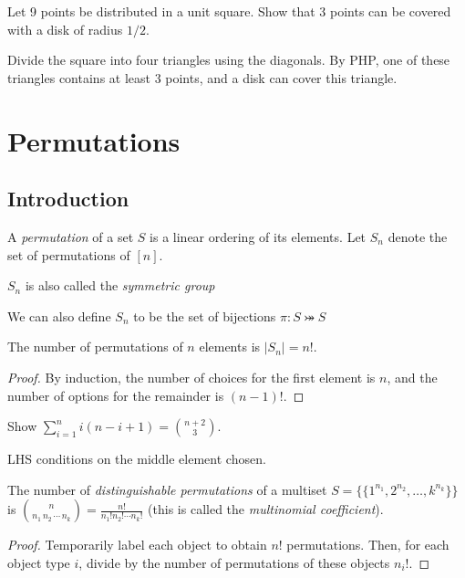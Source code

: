 \documentclass[a4paper]{article}
\begin{document}
\begin{example}
Let 9 points be distributed in a unit square. Show that 3 points can be covered with a disk of radius $1/2$.

\begin{hl}
Divide the square into four triangles using the diagonals. By PHP, one of these triangles contains at least 3 points, and a disk can cover this triangle.
\end{hl}
\end{example}


\section{Permutations}

\subsection{Introduction}

\begin{definition}
A \emph{permutation} of a set $S$ is a linear ordering of its elements. Let $S_n$ denote the set of permutations of $[n]$.
\begin{arrows}
\item $S_n$ is also called the \emph{symmetric group}
\item We can also define $S_n$ to be the set of bijections $\pi:S\bij S$
\end{arrows}
\end{definition}

\begin{theorem}
The number of permutations of $n$ elements is $|S_n|=n!$.

\begin{hl}
\begin{proof}
By induction, the number of choices for the first element is $n$, and the number of options for the remainder is $(n-1)!$.
\end{proof}
\end{hl}
\end{theorem}

\begin{example}
Show $\sum_{i=1}^ni(n-i+1)=\binom{n+2}3$.

\begin{hl}
LHS conditions on the middle element chosen.
\end{hl}
\end{example}

\begin{theorem}
The number of \emph{distinguishable permutations} of a multiset $S=\{\{1^{n_1},2^{n_2},\dots,k^{n_k}\}\}$ is $\binom{n}{n_1\,n_2\,\cdots\,n_k}=\frac{n!}{n_1!n_2!\cdots n_k!}$ (this is called the \emph{multinomial coefficient}).

\begin{hl}
\begin{proof}
Temporarily label each object to obtain $n!$ permutations. Then, for each object type $i$, divide by the number of permutations of these objects $n_i!$.
\end{proof}
\end{hl}
\end{theorem}
\end{document}
